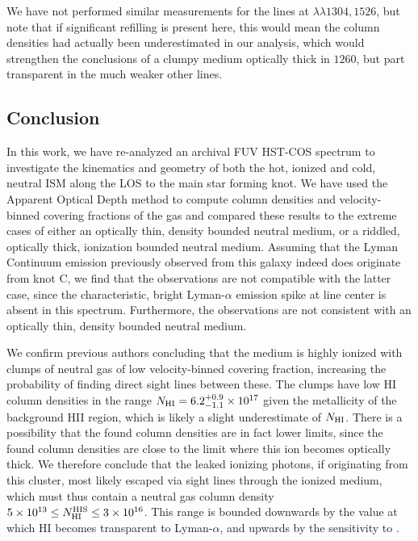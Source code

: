 \documentclass[twocolumn]{aastex61}
\begin{document}
We have not performed similar measurements for the lines at
$\lambda \lambda 1304, 1526$, but note that if significant refilling is
present here, this would mean the column densities had actually been
underestimated in our analysis, which would strengthen the conclusions
of a clumpy medium optically thick in  $1260$, but part
transparent in the much weaker other lines.

\subsection{Conclusion}\label{conclusion}

In this work, we have re-analyzed an archival FUV HST-COS spectrum to
investigate the kinematics and geometry of both the hot, ionized and
cold, neutral ISM along the LOS to the main star forming knot. We have
used the Apparent Optical Depth method to compute column densities and
velocity-binned covering fractions of the gas and compared these results
to the extreme cases of either an optically thin, density bounded
neutral medium, or a riddled, optically thick, ionization bounded
neutral medium. Assuming that the Lyman Continuum emission previously
observed from this galaxy indeed does originate from knot C, we find
that the observations are not compatible with the latter case, since the
characteristic, bright Lyman-$\alpha$ emission spike at line center is
absent in this spectrum. Furthermore, the observations are not
consistent with an optically thin, density bounded neutral medium.

We confirm previous authors concluding that the medium is highly ionized
with clumps of neutral gas of low velocity-binned covering fraction,
increasing the probability of finding direct sight lines between these.
The clumps have low HI column densities in the range
$N_{\rm HI} = 6.2^{+0.9}_{-1.1} \times 10^{17}$ given the metallicity of
the background HII region, which is likely a slight underestimate of
$N_{\rm HI}$. There is a possibility that the found column densities are
in fact lower limits, since the found  column densities are
close to the limit where this ion becomes optically thick. We therefore
conclude that the leaked ionizing photons, if originating from this
cluster, most likely escaped via sight lines through the ionized medium,
which must thus contain a neutral gas column density
$5 \times 10^{13} \leq N_{\rm HI}^{\rm HIS} \leq 3 \times 10^{16}$. This
range is bounded downwards by the value at which HI becomes transparent
to Lyman-$\alpha$, and upwards by the sensitivity to .
\end{document}
